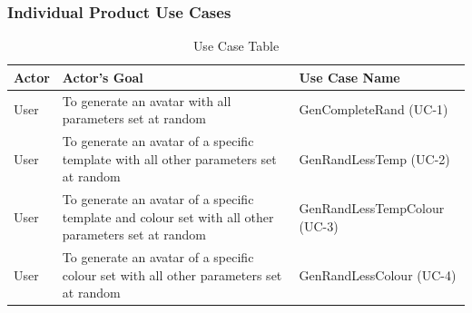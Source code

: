 \documentclass[12pt, titlepage]{article}
\begin{document}
\subsubsection{Individual Product Use Cases}
\begin{table}[h]
\caption{Use Case Table}
\label{uc}
\begin{tabular}{|p{2cm}|p{9cm}|p{5cm}|}
\hline
Actor & Actor's Goal                                                                                        & Use Case Name                \\ \hline
User  & To generate an avatar with all parameters set at random                                             & GenCompleteRand (UC-1)       \\ \hline
User  & To generate an avatar of a specific template with all other parameters set at random                & GenRandLessTemp (UC-2)       \\ \hline
User  & To generate an avatar of a specific template and colour set with all other parameters set at random & GenRandLessTempColour (UC-3) \\ \hline
User  & To generate an avatar of a specific colour set with all other parameters set at random              & GenRandLessColour (UC-4)     \\ \hline
\end{tabular}
\end{table}
\end{document}
